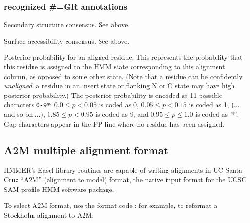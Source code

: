 \subsubsection{recognized \#=GR annotations}
\begin{sreitems}{}
\item [\emprog{SS}]
        Secondary structure consensus. See  above.
\item [\emprog{SA}]
        Surface accessibility consensus. See  above.
\item [\emprog{PP}] Posterior probability for an aligned residue. This
  represents the probability that this residue is assigned to the HMM
  state corresponding to this alignment column, as opposed to some
  other state. (Note that a residue can be confidently
  \emph{unaligned}: a residue in an insert state or flanking N or C
  state may have high posterior probability.) The posterior
  probability is encoded as 11 possible characters \verb+0-9*+: $0.0
  \leq p < 0.05$ is coded as 0, $0.05 \leq p < 0.15$ is coded as 1,
  (... and so on ...), $0.85 \leq p < 0.95$ is coded as 9, and $0.95
  \leq p \leq 1.0$ is coded as '*'. Gap characters appear in the PP
  line where no residue has been assigned.
\end{sreitems}



\subsection{A2M multiple alignment format}

HMMER's Easel library routines are capable of writing alignments in UC
Santa Cruz ``A2M'' (alignment to model) format, the native input
format for the UCSC SAM profile HMM software package. 

To select A2M format, use the format code : for example, 
to reformat a Stockholm alignment to A2M:

